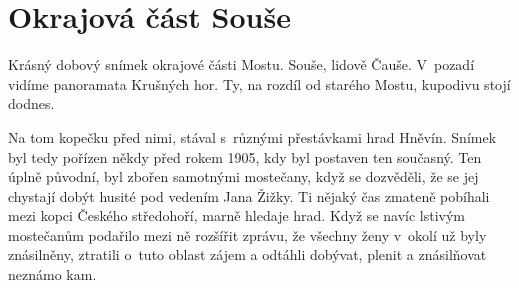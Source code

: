 
\chapter{Okrajová část Souše}

Krásný dobový snímek okrajové části Mostu. Souše, lidově Čauše. V~pozadí vidíme
panoramata Krušných hor. Ty, na rozdíl od starého Mostu, kupodivu stojí dodnes.

Na tom kopečku před nimi, stával s~různými přestávkami hrad Hněvín.
Snímek byl tedy pořízen někdy před rokem 1905, kdy byl postaven ten
současný. Ten úplně původní, byl zbořen samotnými mostečany, když se
dozvěděli, že se jej chystají dobýt husité pod vedením Jana Žižky. Ti
nějaký čas zmateně pobíhali mezi kopci Českého středohoří, marně
hledaje hrad. Když se navíc lstivým mostečanům podařilo mezi ně
rozšířit zprávu, že všechny ženy v~okolí už byly znásilněny, ztratili
o~tuto oblast zájem a odtáhli dobývat, plenit a znásilňovat neznámo
kam.

